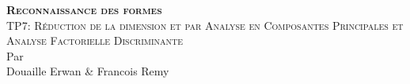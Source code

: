 \makeatletter
\begin{titlepage}
\centering
{\LARGE \textbf{\textsc{Reconnaissance des formes}}}\\
\vspace{20em}
{\LARGE \textsc{TP7: Réduction de la dimension
et
par Analyse en Composantes Principales et Analyse
Factorielle Discriminante
}}\\

\vspace{15em}
Par\\
\vspace{3em}
{\LARGE Douaille Erwan \& Francois Remy}\\

\vspace{5em}

\end{titlepage}
\makeatother

\sloppy